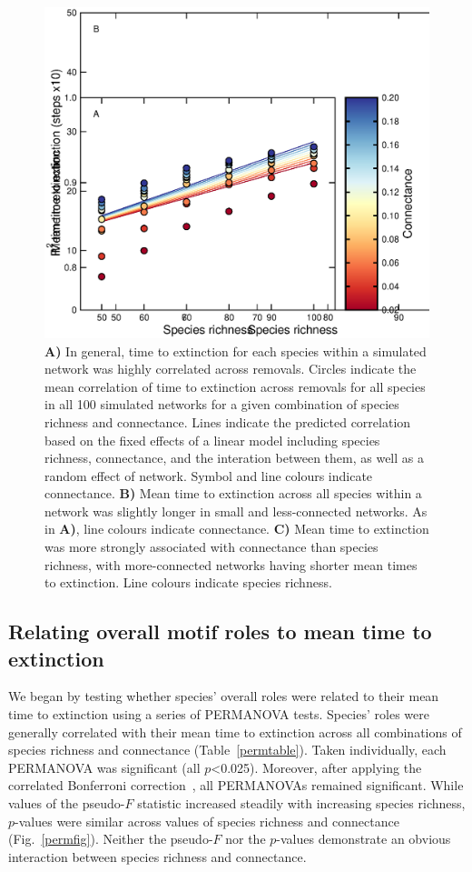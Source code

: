 \documentclass[12pt]{article}
\begin{document}
		\begin{figure}[hb!]
			\caption{\textbf{A)} In general, time to extinction for each species within a simulated network was highly correlated across removals. Circles indicate the mean correlation of time to extinction across removals for all species in all 100 simulated networks for a given combination of species richness and connectance. Lines indicate the predicted correlation based on the fixed effects of a linear model including species richness, connectance, and the interation between them, as well as a random effect of network. Symbol and line colours indicate connectance. \textbf{B)} Mean time to extinction across all species within a network was slightly longer in small and less-connected networks. As in \textbf{A)}, line colours indicate connectance. \textbf{C)} Mean time to extinction was more strongly associated with connectance than species richness, with more-connected networks having shorter mean times to extinction. Line colours indicate species richness.}
			\label{extorder_corrs}
			\includegraphics[width=.75\textwidth]{figures/extinction_order/extorder_correlations.eps}
			\end{figure}

    \subsection*{Relating overall motif roles to mean time to extinction}
    
        We began by testing whether species' overall roles were related to their mean time to extinction using a series of PERMANOVA tests.
		Species' roles were generally correlated with their mean time to extinction across all combinations of species richness and connectance (Table~\ref{permtable}). Taken individually, each PERMANOVA was significant (all $p$\textless0.025). Moreover, after applying the correlated Bonferroni correction~\citep{Drezner2016}, all PERMANOVAs remained significant. While values of the pseudo-$F$ statistic increased steadily with increasing species richness, $p$-values were similar across values of species richness and connectance (Fig.~\ref{permfig}). Neither the pseudo-$F$ nor the $p$-values demonstrate an obvious interaction between species richness and connectance.
\end{document}
